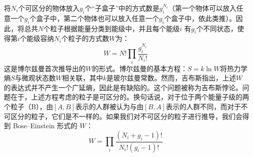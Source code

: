 将\(N_i\)个可区分的物体放入\(g_i\)个“子盒子”中的方式数是\(g_i^{N_i} \)（第一个物体可以放入任意一个\(g_i\)个盒子中，第二个物体也可以放入任意一个\(g_i\)个盒子中，依此类推）。因此，将总共\( N \)个粒子根据能量分类到能级中，并且每个能级\(i\) 有\( g_i\)个不同状态，使得第\(i\)个能级容纳\( N_i \)个粒子的方式数\(W\)为：
\[
W = N! \prod_{i} \frac{g_i^{N_i}}{N_i!}~
\]
这是博尔兹曼首次推导出的\(W\)的形式。博尔兹曼的基本方程：\(S = k \ln W\)将热力学熵\( S \)与微观状态数\( W \)相关联，其中\( k \)是玻尔兹曼常数。然而，吉布斯指出，上述\( W \)的表达式并不产生一个广延熵，因此是有缺陷的。这个问题被称为吉布斯悖论。问题在于，上述方程考虑的粒子是可区分的。换句话说，对于位于两个能量子级的两个粒子（\和 B），由\([A, B]\)表示的人群被认为与由\([B, A]\)表示的人群不同，而对于不可区分的粒子，它们是不一样的。如果我们对不可区分的粒子进行推导，我们会得到 Bose–Einstein 形式的 \( W \)：
\[
W = \prod_{i} \frac{(N_i + g_i - 1)!}{N_i!(g_i - 1)!}~
\]